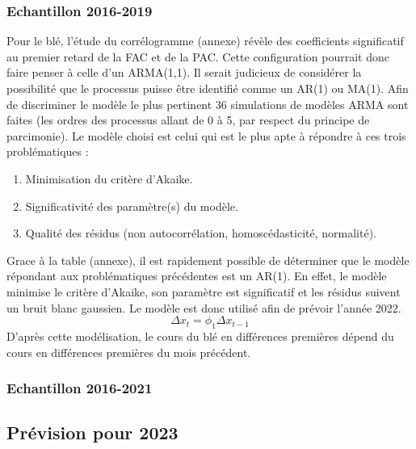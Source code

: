 \subsubsection{Echantillon 2016-2019}
Pour le blé, l'étude du corrélogramme (annexe) révèle des coefficients significatif au premier retard de la FAC et de la PAC. Cette configuration pourrait donc faire penser
à celle d'un ARMA(1,1). Il serait judicieux de considérer la possibilité que le processus puisse être identifié comme un AR(1) ou MA(1). Afin de discriminer le modèle le
plus pertinent 36 simulations de modèles ARMA sont faites (les ordres des processus allant de 0 à 5, par respect du principe de parcimonie). Le modèle choisi est celui qui
est le plus apte à répondre à ces trois problématiques : 
\begin{enumerate}
    \item Minimisation du critère d'Akaike.
    \item Significativité des paramètre(s) du modèle.
    \item Qualité des résidus (non autocorrélation, homoscédasticité, normalité).
\end{enumerate}
Grace à la table (annexe), il est rapidement possible de déterminer que le modèle répondant aux problématiques précédentes est un AR(1). En effet, le modèle minimise le 
critère d'Akaike, son paramètre est significatif et les résidus suivent un bruit blanc gaussien. Le modèle est donc utilisé afin de prévoir l'année 2022.
\begin{equation*}
    \Delta x_{t} = \phi_{1} \Delta x_{t-1}
\end{equation*}
D'après cette modélisation, le cours du blé en différences premières dépend du cours en différences premières du mois précédent.

\subsubsection{Echantillon 2016-2021}

\subsection{Prévision pour 2023}